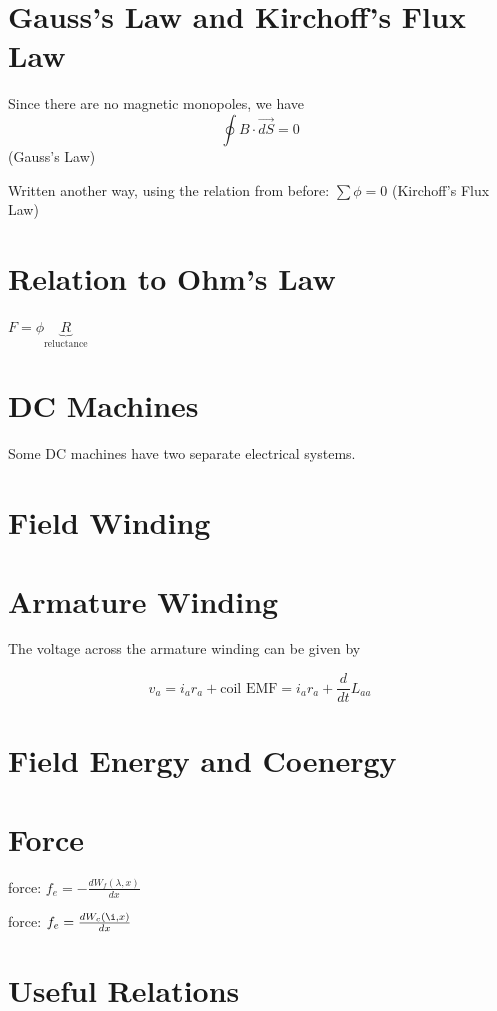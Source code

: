 \documentclass[11pt]{article}
\begin{document}
\section{Gauss's Law and Kirchoff's Flux Law}
\label{sec:org8314f68}

Since there are no magnetic monopoles, we have $$\oint B \cdot \overrightarrow{dS} = 0$$ (Gauss's Law)

Written another way, using the relation from before: \(\sum \phi = 0\) (Kirchoff's Flux Law)

\section{Relation to Ohm's Law}
\label{sec:orgbc090c4}

\(F = \phi \underbrace{R}_\text{reluctance}\)

\section{DC Machines}
\label{sec:org5bf748a}
Some DC machines have two separate electrical systems.

\section{Field Winding}
\label{sec:org9777dbb}
\section{Armature Winding}
\label{sec:orgd369a5e}
The voltage across the armature winding can be given by 

$$v_a = i_a r_a + \text{coil EMF} = i_a r_a + \frac{d}{dt} L_{aa}$$

\section{Field Energy and Coenergy}
\label{sec:org361bb91}
\section{Force}
\label{sec:orge858de4}
force: \(f_e = - \frac{dW_f(\lambda, x)}{dx}\)

force: \(f_e = \frac{dW_c(\i, x)}{dx}\)

\section{Useful Relations}
\label{sec:org233e2bc}
\end{document}
